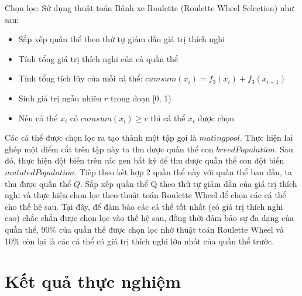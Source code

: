 \documentclass{article}
\begin{document}
\newline Chọn lọc: Sử dụng thuật toán Bánh xe Roulette (Roulette Wheel Selection) như sau:
\begin{itemize}
    \item Sắp xếp quần thể theo thứ tự giảm dần giá trị thích nghi
    \item Tính tổng giá trị thích nghi của cả quần thể
    \item Tính tổng tích lũy của mỗi cá thể: $cumsum(x_i) = f_3(x_i) + f_3(x_{i-1}) $
    \item Sinh giá trị ngẫu nhiên $r$ trong đoạn [0, 1)
    \item Nếu cá thể $x_i$ có $cumsum(x_i) \geq r$ thì cá thể $x_i$ được chọn 
\end{itemize}
Các cá thể được chọn lọc ra tạo thành một tập gọi là $ mating pool$. Thực hiện lai ghép một điểm cắt trên tập này ta thu được quần thể con $breedPopulation$. Sau đó, thực hiện đột biến trên các gen bất kỳ để thu được quần thể con đột biến $mutatedPopulation$. Tiếp theo kết hợp 2 quần thể này với quần thể ban đầu, ta thu được quần thể $Q$.
\newline Sắp xếp quần thể Q theo thứ tự giảm dần của giá trị thích nghi và thực hiện chọn lọc theo thuật toán Roulette Wheel để chọn các cá thể cho thế hệ sau. Tại đây, để đảm bảo các cá thể tốt nhất (có giá trị thích nghi cao) chắc chắn được chọn lọc vào thế hệ sau, đồng thời đảm bảo sự đa dạng của quần thể, 90\% của quần thể được chọn lọc nhờ thuật toán Roulette Wheel và 10\% còn lại là các cá thể có giá trị thích nghi lớn nhất của quần thể trước.

\section{Kết quả thực nghiệm}

\newpage
\end{document}
